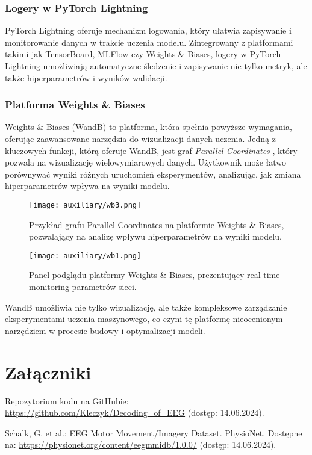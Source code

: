 \documentclass[12pt,twoside]{article}
\begin{document}
\subsubsection{Logery w PyTorch Lightning}
PyTorch Lightning oferuje mechanizm logowania, który ułatwia zapisywanie i monitorowanie danych w trakcie uczenia
modelu. Zintegrowany z platformami takimi jak TensorBoard, MLFlow czy Weights \&
Biases, logery w PyTorch Lightning umożliwiają automatyczne śledzenie i zapisywanie nie tylko metryk, ale także
hiperparametrów i wyników walidacji.

\subsubsection{Platforma Weights \& Biases}
Weights \&
Biases (WandB) to platforma, która spełnia powyższe wymagania, oferując zaawansowane narzędzia do wizualizacji danych
uczenia. Jedną z kluczowych funkcji, którą oferuje WandB, jest graf \textit{Parallel Coordinates}
, który pozwala na wizualizację wielowymiarowych danych. Użytkownik może łatwo porównywać wyniki różnych uruchomień
eksperymentów, analizując, jak zmiana hiperparametrów wpływa na wyniki modelu.

\begin{figure}[ht]
    \centering
    \texttt{[image: auxiliary/wb3.png]}
    \caption{Przykład grafu Parallel Coordinates na platformie Weights \& Biases,
        pozwalający na analizę wpływu hiperparametrów na wyniki modelu.}
    \label{fig:parallel_coordinates}
\end{figure}

\begin{figure}[ht]
    \centering
    \texttt{[image: auxiliary/wb1.png]}
    \caption{Panel podglądu platformy Weights \& Biases, prezentujący real-time monitoring parametrów sieci.}
    \label{fig:wandb_dashboard}
\end{figure}

WandB umożliwia nie tylko wizualizację, ale także kompleksowe zarządzanie eksperymentami uczenia maszynowego, co czyni
tę platformę nieocenionym narzędziem w procesie budowy i optymalizacji modeli.
\clearpage

\section*{Załączniki}
Repozytorium kodu na GitHubie:
\url{https://github.com/Kleczyk/Decoding_of_EEG} (dostęp: 14.06.2024).

\clearpage


\begin{thebibliography}{99}

     Schalk, G. et al.: EEG Motor Movement/Imagery Dataset. PhysioNet. Dostępne na:
    \url{https://physionet.org/content/eegmmidb/1.0.0/} (dostęp: 14.06.2024).
\end{thebibliography}


\clearpage
\end{document}
